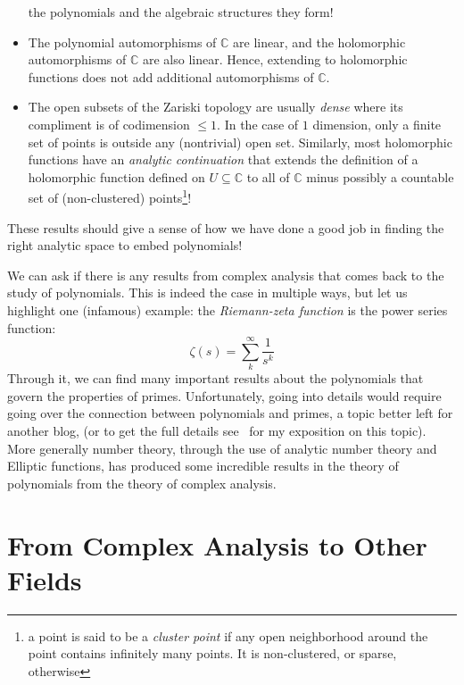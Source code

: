\documentclass[oneside]{article}
\newcommand{\C}{\mathbb{C}}
\newcommand{\sse}{\subseteq}
\begin{document}
\begin{itemize}
      the polynomials and the algebraic structures they form!
  \item The polynomial automorphisms of $\C$ are linear, and the holomorphic automorphisms of $\C$ are also
    linear. Hence, extending to holomorphic functions does not add additional automorphisms of $\C$.
  \item The open subsets of the Zariski topology are usually \emph{dense} where its compliment is of
    codimension $\le 1$. In the case of $1$ dimension, only a finite set of points is outside any
    (nontrivial) open set. Similarly, most holomorphic functions have an \emph{analytic continuation} that
    extends the definition of a holomorphic function defined on $U \sse \C$ to all of $\C$ minus possibly a
    countable set of (non-clustered) points\footnote{a point is said to be a \emph{cluster point} if any
      open neighborhood around the point contains infinitely many points. It is non-clustered, or sparse,
    otherwise}!
\end{itemize}

These results should give a sense of how we have done a good job in finding the right analytic space to
embed polynomials!

We can ask if there is any results from complex analysis that comes back to the
study of polynomials. This is indeed the case in multiple ways, but let us highlight one (infamous) example: the
\emph{Riemann-zeta function} is the power series function:
\[
  \zeta(s) = \sum_k^\infty \frac{1}{s^k}
\]
Through it, we can find many important results about the polynomials that govern the properties of primes.
Unfortunately, going into details would require going over the connection between polynomials and primes,
a topic better left for another blog, (or to get the full details
see~\cite[chapter~3]{nathanaelchwojko-srawleyEverythingYouNeed} for my exposition on this topic). More
generally number theory, through the use of analytic number theory and Elliptic functions, has produced some
incredible results in the theory of polynomials from the theory of complex analysis.



\section{From Complex Analysis to Other Fields}
\end{document}
